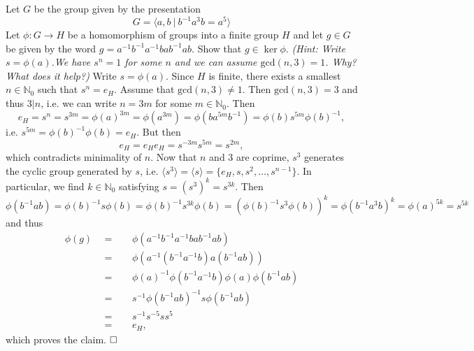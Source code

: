 \documentclass[11pt]{book}
\numberwithin{dummy}{section}
\theoremstyle{nonumberbreak}
\newenvironment{sol}[1][]{\ifthenelse{\equal{#1}{}}{\solution}{\solution[#1]}\rm}{\endsolution}
\newenvironment{prob}[1][]{\ifthenelse{\equal{#1}{}}{\problem}{\problem[#1]}\rm}{\endproblem}
\newcommand{\la}{\longrightarrow}
\begin{document}
\begin{spacing}{1.4}
\begin{prob}  %
Let $G$ be the group given by the presentation 
$$G= \langle a,b \ \vert \ b^{-1}a^3b = a^5 \rangle$$
Let $\phi: G \la H$ be a homomorphism of groups into a finite group $H$ and let $g \in G$ be given by the word $g=a^{-1}b^{-1}a^{-1}bab^{-1}ab$. Show that $g \in \ker \phi$. \textit{(Hint: Write $s=\phi(a)$.We have $s^n=1$ for some $n$ and we can assume $\mathrm{gcd}(n,3)=1$. Why? What does it help?)}
\begin{sol}
Write $s=\phi(a)$. Since $H$ is finite, there exists a smallest $n \in \mathbb{N}_0$ such that $s^n = e_H$. Assume that $\mathrm{gcd}(n,3) \neq 1$. Then $\mathrm{gcd}(n,3)=3$ and thus $3 \vert n$, i.e. we can write $n=3m$ for some $m \in \mathbb{N}_0$. Then 
$$e_H= s^n = s^{3m} = \phi(a)^{3m} = \phi(a^{3m}) = \phi(ba^{5m}b^{-1}) = \phi(b) s^{5m} \phi(b)^{-1},$$
i.e. $s^{5m} = \phi(b)^{-1} \phi(b) = e_H$. But then
$$e_H = e_H e_H = s^{-3m} s^{5m} = s^{2m},$$
which contradicts minimality of $n$. Now that $n$ and $3$ are coprime, $s^3$ generates the cyclic group generated by $s$, i.e. $\langle s^3 \rangle = \langle s \rangle = \{e_H, s, s^{2}, \ldots, s^{n-1} \}$. In particular, we find $k \in \mathbb{N}_0$ satisfying $s=(s^3)^k = s^{3k}$. Then
$$\phi(b^{-1}ab) = \phi(b)^{-1} s \phi(b) = \phi(b)^{-1} s^{3k} \phi(b) = \left( \phi(b)^{-1} s^3 \phi(b)\right)^k =\phi(b^{-1}a^3b)^k = \phi(a)^{5k} = s^{5k}$$
and thus
\begin{alignat*}{5}
\phi(g) \ \ &=&& \ \ \phi(a^{-1}b^{-1}a^{-1}bab^{-1}ab) \\
&=&& \ \ \phi(a^{-1} (b^{-1}a^{-1}b) a (b^{-1}ab))\\
&=&& \ \ \phi(a)^{-1} \phi(b^{-1}a^{-1}b) \phi(a) \phi(b^{-1}ab) \\
&=&& \ \ s^{-1} \phi(b^{-1}ab)^{-1} s \phi(b^{-1}ab) \\
&=&& \ \ s^{-1}s^{-5} s s^{5} \\
&=&& \ \ e_H,
\end{alignat*}
which proves the claim. $\hfill \Box$
\end{sol}


\end{prob}




\end{spacing}
\end{document}
